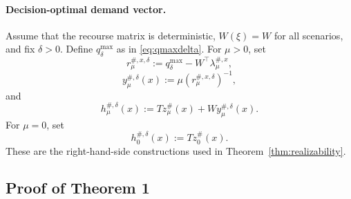 \documentclass{article}
\newcommand{\1}{\mathbf{1}}
\theoremstyle{plain}
\theoremstyle{definition}
\theoremstyle{remark}
\begin{document}
\paragraph{Decision-optimal demand vector.}
Assume that the recourse matrix is deterministic, $W(\xi)=W$ for all scenarios, and fix $\delta>0$. Define $q_\delta^{\max}$ as in \eqref{eq:qmaxdelta}. For $\mu>0$, set
\begin{equation}
\label{eq:core-h-residual}
r_\mu^{\#,x,\delta}
:=
q_\delta^{\max}-W^\top\lambda_\mu^{\#,x},
\end{equation}
\begin{equation}
\label{eq:core-y-construct}
y_\mu^{\#,\delta}(x)
:=
\mu\left(r_\mu^{\#,x,\delta}\right)^{-1},
\end{equation}
and
\begin{equation}
\label{eq:core-h-construct}
h_\mu^{\#,\delta}(x)
:=
Tz_\mu^\#(x)+Wy_\mu^{\#,\delta}(x).
\end{equation}
For $\mu=0$, set
\begin{equation}
\label{eq:core-h-construct-zero}
h_0^{\#,\delta}(x):=Tz_0^\#(x).
\end{equation}
These are the right-hand-side constructions used in Theorem~\ref{thm:realizability}.

\subsection{Proof of Theorem 1}
\end{document}

